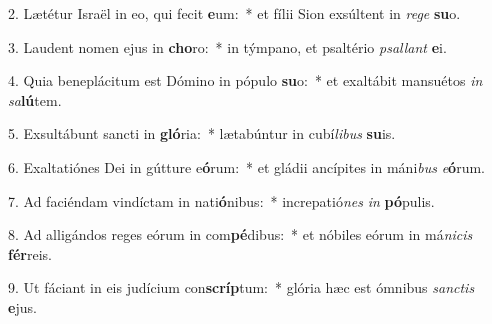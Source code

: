 2. Lætétur Israël in eo, qui fecit \textbf{e}um:~*  et fílii Sion exsúltent in \textit{re}\textit{ge} \textbf{su}o.\

3. Laudent nomen ejus in \textbf{cho}ro:~*  in týmpano, et psaltério \textit{psal}\textit{lant} \textbf{e}i.\

4. Quia beneplácitum est Dómino in pópulo \textbf{su}o:~*  et exaltábit mansuétos \textit{in} \textit{sa}\textbf{lú}tem.\

5. Exsultábunt sancti in \textbf{gló}ria:~*  lætabúntur in cubí\textit{li}\textit{bus} \textbf{su}is.\

6. Exaltatiónes Dei in gútture e\textbf{ó}rum:~*  et gládii ancípites in máni\textit{bus} \textit{e}\textbf{ó}rum.\

7. Ad faciéndam vindíctam in nati\textbf{ó}nibus:~*  increpatió\textit{nes} \textit{in} \textbf{pó}pulis.\

8. Ad alligándos reges eórum in com\textbf{pé}dibus:~*  et nóbiles eórum in má\textit{ni}\textit{cis} \textbf{fér}reis.\

9. Ut fáciant in eis judícium con\textbf{scríp}tum:~*  glória hæc est ómnibus \textit{sanc}\textit{tis} \textbf{e}jus.\

